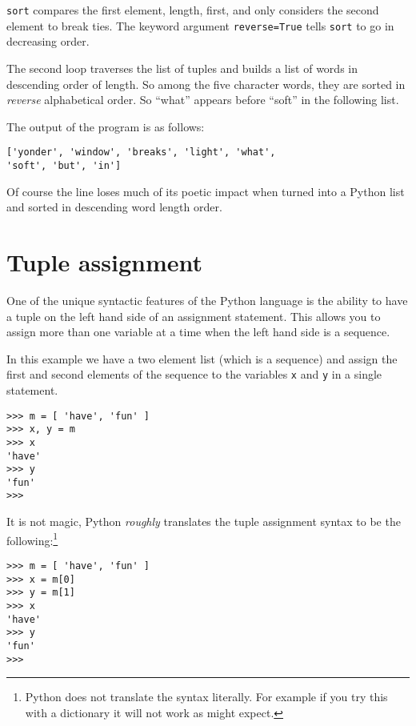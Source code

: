 {\tt sort} compares the first element, length, first, and
only considers the second element to break ties.  The keyword argument
{\tt reverse=True} tells {\tt sort} to go in decreasing order.


The second loop traverses the list of tuples and builds a list of
words in descending order of length.  So among the five character words,
they are sorted in {\em reverse} alphabetical order.  So ``what'' appears
before ``soft'' in the following list.

The output of the program is as follows:
%
\beforeverb
\begin{verbatim}
['yonder', 'window', 'breaks', 'light', 'what', 
'soft', 'but', 'in']
\end{verbatim}
\afterverb
%
Of course the line loses much of its poetic impact 
when turned into a Python list and sorted in 
descending word length order.

\section{Tuple assignment}
\label{tuple assignment}


One of the unique syntactic features of the Python language
is the ability to have a tuple on the left hand
side of an assignment statement.  This allows you to assign
more than one variable at a time when the left hand side is a 
sequence.

In this example we have a two element list (which is a sequence) and
assign the first and second elements of the sequence
to the variables {\tt x} and {\tt y} in a single statement.

\beforeverb
\begin{verbatim}
>>> m = [ 'have', 'fun' ]
>>> x, y = m
>>> x
'have'
>>> y
'fun'
>>> 
\end{verbatim}
\afterverb
%
It is not magic, Python \emph{roughly} translates the 
tuple assignment syntax
to be the following:\footnote{Python does not translate the 
syntax literally.  For example if you try this with a dictionary
it will not work as might expect.}

\beforeverb
\begin{verbatim}
>>> m = [ 'have', 'fun' ]
>>> x = m[0]
>>> y = m[1]
>>> x
'have'
>>> y
'fun'
>>> 
\end{verbatim}
\afterverb

